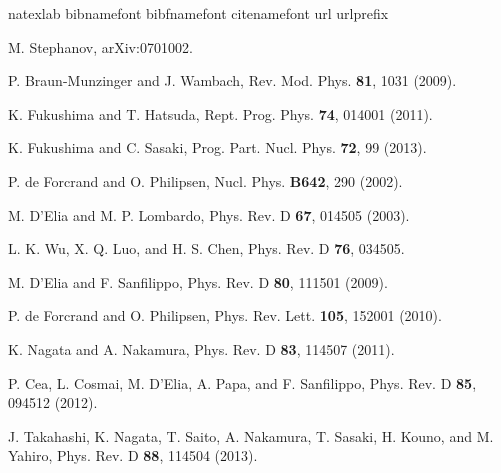 \documentclass[prd,superscriptaddress,unsortedaddress,
twocolumn,showpacs,preprintnumbers,amsmath,amssymb]{revtex4}
\begin{document}
\begin{thebibliography}{99}
\expandafter\ifx\csname natexlab\endcsname\relax\def\natexlab#1{#1}\fi
\expandafter\ifx\csname bibnamefont\endcsname\relax
  \def\bibnamefont#1{#1}\fi
\expandafter\ifx\csname bibfnamefont\endcsname\relax
  \def\bibfnamefont#1{#1}\fi
\expandafter\ifx\csname citenamefont\endcsname\relax
  \def\citenamefont#1{#1}\fi
\expandafter\ifx\csname url\endcsname\relax
  \def\url#1{\texttt{#1}}\fi
\expandafter\ifx\csname urlprefix\endcsname\relax\def\urlprefix{URL }\fi
\providecommand{\bibinfo}[2]{#2}
 \providecommand{\eprint}[2][]{\url{#2}}


         M. Stephanov, arXiv:0701002.

         P. Braun-Munzinger and J. Wambach,
         Rev. Mod. Phys. \textbf{81}, 1031 (2009).
          
         K. Fukushima and T. Hatsuda,
         Rept. Prog. Phys. \textbf{74}, 014001 (2011).

         K. Fukushima and C. Sasaki,
         Prog. Part. Nucl. Phys. \textbf{72}, 99 (2013).

         P. de Forcrand and O. Philipsen,
         Nucl. Phys. \textbf{B642}, 290 (2002).

         M. D'Elia and M. P. Lombardo,
         Phys. Rev. D \textbf{67}, 014505 (2003).

         L. K. Wu, X. Q. Luo, and H. S. Chen,
         Phys. Rev. D \textbf{76}, 034505.

         M. D'Elia and F. Sanfilippo,
         Phys. Rev. D \textbf{80}, 111501 (2009).

         P. de Forcrand and O. Philipsen,
         Phys. Rev. Lett. \textbf{105}, 152001 (2010).

         K. Nagata and A. Nakamura,
         Phys. Rev. D \textbf{83}, 114507 (2011).

         P. Cea, L. Cosmai, M. D'Elia, A. Papa, and F. Sanfilippo,
         Phys. Rev. D \textbf{85}, 094512 (2012).

         J. Takahashi, K. Nagata, T. Saito, A. Nakamura, T. Sasaki,
         H. Kouno, and M. Yahiro,
         Phys. Rev. D \textbf{88}, 114504 (2013).


\end{thebibliography}
\end{document}
